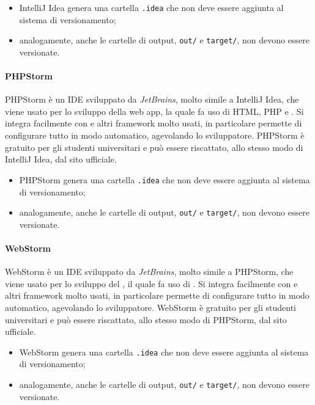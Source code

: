 					\begin{itemize}
						\item IntelliJ Idea genera una cartella \verb!.idea! che non deve essere aggiunta al sistema di versionamento;
						\item analogamente, anche le cartelle di output, \verb!out/! e \verb!target/!, non devono essere versionate.
					\end{itemize}

				\paragraph{PHPStorm}
					PHPStorm è un IDE sviluppato da \textit{JetBrains}, molto simile a IntelliJ Idea, che viene usato per lo sviluppo della web app, la quale fa uso di HTML, PHP e . 
					\newline
					Si integra facilmente con  e altri framework molto usati, in particolare permette di configurare tutto in modo automatico, agevolando lo sviluppatore. 
					\newline
					PHPStorm è gratuito per gli studenti universitari e può essere riscattato, allo stesso modo di IntelliJ Idea, dal sito ufficiale. 

					\begin{itemize}
						\item PHPStorm genera una cartella \verb!.idea! che non deve essere aggiunta al sistema di versionamento;
						\item analogamente, anche le cartelle di output, \verb!out/! e \verb!target/!, non devono essere versionate.
					\end{itemize}
				
				\paragraph{WebStorm}
					WebStorm è un IDE sviluppato da \textit{JetBrains}, molto simile a PHPStorm, che viene usato per lo sviluppo del , il quale fa uso di .
					\newline
					Si integra facilmente con  e altri framework molto usati, in particolare permette di configurare tutto in modo automatico, agevolando lo sviluppatore.
					\newline
					WebStorm è gratuito per gli studenti universitari e può essere riscattato, allo stesso modo di PHPStorm, dal sito ufficiale. 
					
					\begin{itemize}
						\item WebStorm genera una cartella \verb!.idea! che non deve essere aggiunta al sistema di versionamento;
						\item analogamente, anche le cartelle di output, \verb!out/! e \verb!target/!, non devono essere versionate.
					\end{itemize}
				
